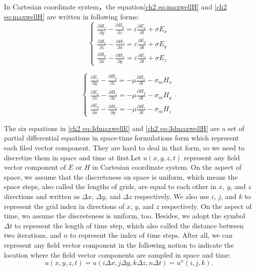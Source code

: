 In  Cartesian coordinate system，the equation\eqref{ch2 eq:maxwellH} and \eqref{ch2 eq:maxwellH} are written in following forms:
\begin{equation}\label{ch2 eq:3dmaxwellE}
\begin{cases}
\frac{\partial H_z}{\partial y}-\frac{\partial H_y}{\partial z}=\varepsilon\frac{\partial E_x}{\partial t}+\sigma E_x\\
\frac{\partial H_x}{\partial z}-\frac{\partial H_z}{\partial x}=\varepsilon\frac{\partial E_y}{\partial t}+\sigma E_y\\
\frac{\partial H_y}{\partial x}-\frac{\partial H_x}{\partial y}=\varepsilon\frac{\partial E_z}{\partial t}+\sigma E_z
\end{cases}
\end{equation}

\begin{equation}\label{ch2 eq:3dmaxwellH}
\begin{cases}
\frac{\partial E_z}{\partial y}-\frac{\partial H_y}{\partial z}=-\mu\frac{\partial H_x}{\partial t}-\sigma_m H_x\\
\frac{\partial E_x}{\partial z}-\frac{\partial H_z}{\partial x}=-\mu\frac{\partial H_y}{\partial t}-\sigma_m H_y\\
\frac{\partial E_y}{\partial x}-\frac{\partial H_x}{\partial y}=-\mu\frac{\partial H_z}{\partial t}-\sigma_m H_z
\end{cases}.
\end{equation}

The six equations in \eqref{ch2 eq:3dmaxwellE} and \eqref{ch2 eq:3dmaxwellH} are a set of partial differential equations in space-time formulations form which represent each filed vector component. They are hard to deal in that form, so we need to discretize them in space and time at first.Let $u(x,y,z,t)$ represent any field vector component of $\mathbf{\mathit{E}}$ or $\mathbf{\mathit{H}}$ in Cartesian coordinate system. On the aspect of space, we assume that the discreteness on space is uniform, which means the space steps, also called the lengths of grids, are equal to each other in $x$, $y$, and $z$ directions and written as $\Delta x$, $\Delta y$, and $\Delta z$ respectively. We also use $i$, $j$, and $k$ to represent the grid index in directions of $x$, $y$, and $z$ respectively. On the aspect of time, wo assume the discreteness is uniform, too. Besides, we adopt the symbol $\Delta t$ to represent the length of time step, which also called the distance between two iterations, and $n$ to represent the index of time steps. After all, we can represent any field vector component in the following notion to indicate the location where the field vector components are sampled in space and time:
\begin{equation}
u(x,y,z,t)=u(i\Delta x,j\Delta y,k\Delta z,n\Delta t)=u^n(i,j,k).
\end{equation}


